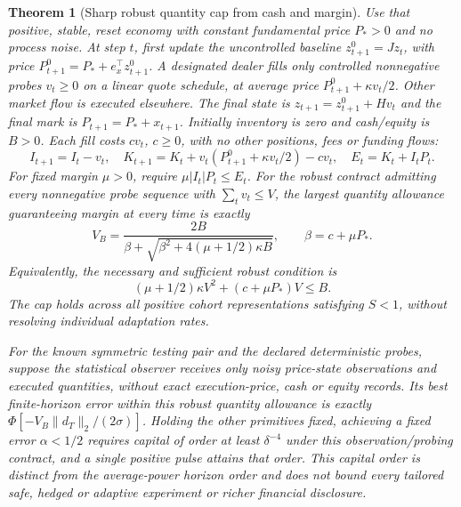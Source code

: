\documentclass[11pt]{article}
\newtheorem{theorem}{Theorem}[section]\newtheorem{proposition}[theorem]{Proposition}\newtheorem{lemma}[theorem]{Lemma}
\begin{document}
\begin{theorem}[Sharp robust quantity cap from cash and margin]
\label{thm:cash_capital_frontier}
Use that positive, stable, reset economy with constant fundamental price $P_*>0$ and no process noise. At step $t$, first update the uncontrolled baseline
$z^0_{t+1}=Jz_t$, with price $P^0_{t+1}=P_*+e_x^\top z^0_{t+1}$.
A designated dealer fills only controlled nonnegative probes $v_t\ge0$ on a linear quote schedule, at average price $P^0_{t+1}+\kappa v_t/2$. Other market flow is executed elsewhere. The final state is $z_{t+1}=z^0_{t+1}+Hv_t$ and the final mark is $P_{t+1}=P_*+x_{t+1}$. Initially inventory is zero and cash/equity is $B>0$. Each fill costs $cv_t$, $c\ge0$, with no other positions, fees or funding flows:
\[
I_{t+1}=I_t-v_t,\quad
K_{t+1}=K_t+v_t(P^0_{t+1}+\kappa v_t/2)-cv_t,
\quad E_t=K_t+I_tP_t.
\]
For fixed margin $\mu>0$, require $\mu|I_t|P_t\le E_t$. For the robust contract admitting every nonnegative probe sequence with $\sum_t v_t\le V$, the largest quantity allowance guaranteeing margin at every time is exactly
\begin{equation}
V_B=\frac{2B}{\beta+\sqrt{\beta^2+4(\mu+1/2)\kappa B}},
\qquad\beta=c+\mu P_*.
\label{eq:cash_quantity_cap}
\end{equation}
Equivalently, the necessary and sufficient robust condition is
\begin{equation}
(\mu+1/2)\kappa V^2+(c+\mu P_*)V\le B.
\label{eq:cash_margin_budget}
\end{equation}
The cap holds across all positive cohort representations satisfying $S<1$, without resolving individual adaptation rates.

For the known symmetric testing pair and the declared deterministic probes, suppose the statistical observer receives only noisy price-state observations and executed quantities, without exact execution-price, cash or equity records. Its best finite-horizon error within this robust quantity allowance is exactly $\Phi[-V_B\|d_T\|_2/(2\sigma)]$. Holding the other primitives fixed, achieving a fixed error $\alpha<1/2$ requires capital of order at least $\delta^{-4}$ under this observation/probing contract, and a single positive pulse attains that order. This capital order is distinct from the average-power horizon order and does not bound every tailored safe, hedged or adaptive experiment or richer financial disclosure.
\end{theorem}
\end{document}
